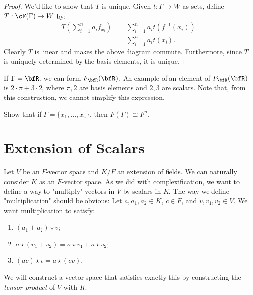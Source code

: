 \begin{proof}
            We'd like to show that $T$ is unique. Given $t:\Gamma \rightarrow W$ as sets, define $T:\cF(\Gamma) \rightarrow W$ by:
                \begin{equation*}
                \begin{split}
                    T\left(\sum_{i = 1}^n a_i f_{x_i}\right)
                    & = \sum_{i=1}^n a_i t(f^{-1}(x_i)) \\
                    & = \sum_{i = 1}^n a_i t(x_i).
                \end{split}
                \end{equation*}
            Clearly $T$ is linear and makes the above diagram commute. Furthermore, since $T$ is uniquely determined by the basis elements, it is unique.
        \end{proof}

    \begin{example}
        If $\Gamma = \bfR$, we can form $F_\bfR(\bfR)$. An example of  an element of $F_\bfR(\bfR)$ is $2 \cdot \pi + 3 \cdot 2$, where $\pi,2$ are basis elements and $2,3$ are scalars. Note that, from this construction, we cannot simplify this expression.
    \end{example}

    \begin{exercise}
        Show that if $\Gamma = \{x_1,...,x_n\}$, then $F(\Gamma) \cong F^n$.
    \end{exercise}

\section{Extension of Scalars}
    Let $V$ be an $F$-vector space and $K/F$ an extension of fields. We can naturally consider $K$ as an $F$-vector space. As we did with complexification, we want to define a way to "multiply" vectors in $V$ by scalars in $K$. The way we define "multiplication" should be obvious: Let $a, a_1,a_2 \in K$, $c\in F$, and $v,v_1,v_2 \in V$. We want multiplication to satisfy:
        \begin{enumerate}[label = (\arabic*)]
            \item $(a_1 + a_2) \star v$;
            \item $a \star (v_1 + v_2) = a \star v_1 + a \star v_2$;
            \item $(ac) \star v = a \star (cv)$.
        \end{enumerate}
    We will construct a vector space that satisfies exactly this by constructing the \textit{tensor product} of $V$ with $K$.

